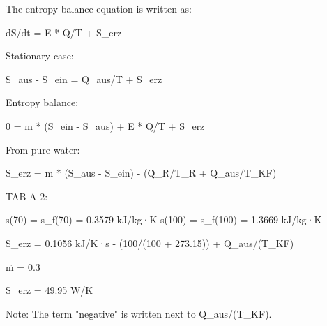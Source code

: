 The entropy balance equation is written as:  

dS/dt = E * Q/T + S_erz  

Stationary case:  

S_aus - S_ein = Q_aus/T + S_erz  

Entropy balance:  

0 = m * (S_ein - S_aus) + E * Q/T + S_erz  

From pure water:  

S_erz = m * (S_aus - S_ein) - (Q̇_R/T_R + Q_aus/T_KF)  

TAB A-2:  

s(70) = s_f(70) = 0.3579 kJ/kg·K  
s(100) = s_f(100) = 1.3669 kJ/kg·K  

S_erz = 0.1056 kJ/K·s - (100/(100 + 273.15)) + Q_aus/(T_KF)  

ṁ = 0.3  

S_erz = 49.95 W/K  

Note: The term "negative" is written next to Q_aus/(T_KF).